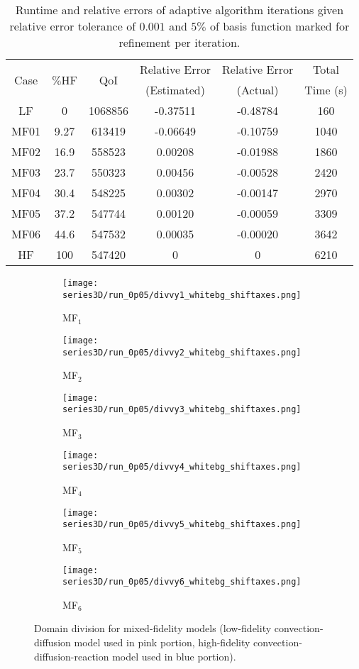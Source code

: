 \begin{table}
\centering
\begin{tabular}{c|c|c|c|c|c}
\multirow{2}{*}{Case} & \multirow{2}{*}{$\%$HF} & \multirow{2}{*}{QoI} & Relative Error & Relative Error & Total \\ 
& & & (Estimated) & (Actual) & Time (s) \\ \hline
LF   & 0    & 1068856 & -0.37511 & -0.48784 & 160 \\
MF01 & 9.27 & 613419  & -0.06649 & -0.10759 & 1040 \\
MF02 & 16.9 & 558523  & 0.00208  & -0.01988 & 1860 \\
MF03 & 23.7 & 550323  & 0.00456  & -0.00528 & 2420 \\
MF04 & 30.4 & 548225  & 0.00302  & -0.00147 & 2970 \\
MF05 & 37.2 & 547744  & 0.00120  & -0.00059 & 3309 \\
MF06 & 44.6 & 547532  & 0.00035  & -0.00020 & 3642 \\
HF   & 100  & 547420  & 0        & 0        & 6210 \\
\end{tabular}
\caption{Runtime and relative errors of adaptive algorithm iterations given relative error tolerance of $0.001$ and $5\%$ of basis function marked for refinement per iteration.}
\label{tab:ref3D_dainty}
\end{table}
%
\begin{figure}[h]
\centering
\begin{subfigure}[t]{0.32\textwidth}
\centering
\texttt{[image: series3D/run\_0p05/divvy1\_whitebg\_shiftaxes.png]} 
\caption{MF$_1$}
\label{fig:ref3d_dainty1}
\end{subfigure}
\begin{subfigure}[t]{0.32\textwidth}
\centering
\texttt{[image: series3D/run\_0p05/divvy2\_whitebg\_shiftaxes.png]} 
\caption{MF$_2$}
\label{fig:ref3d_dainty2}
\end{subfigure}
\begin{subfigure}[t]{0.32\textwidth}
\centering
\texttt{[image: series3D/run\_0p05/divvy3\_whitebg\_shiftaxes.png]} 
\caption{MF$_3$}
\end{subfigure}
\begin{subfigure}[t]{0.32\textwidth}
\centering
\texttt{[image: series3D/run\_0p05/divvy4\_whitebg\_shiftaxes.png]} 
\caption{MF$_4$}
\end{subfigure}
\begin{subfigure}[t]{0.32\textwidth}
\centering
\texttt{[image: series3D/run\_0p05/divvy5\_whitebg\_shiftaxes.png]} 
\caption{MF$_5$}
\end{subfigure}
\begin{subfigure}[t]{0.32\textwidth}
\centering
\texttt{[image: series3D/run\_0p05/divvy6\_whitebg\_shiftaxes.png]} 
\caption{MF$_6$}
\end{subfigure}
\caption{Domain division for mixed-fidelity models (low-fidelity convection-diffusion model used in pink portion, high-fidelity convection-diffusion-reaction model used in blue portion).}
\label{fig:divvy3D_dainty}
\end{figure} 
